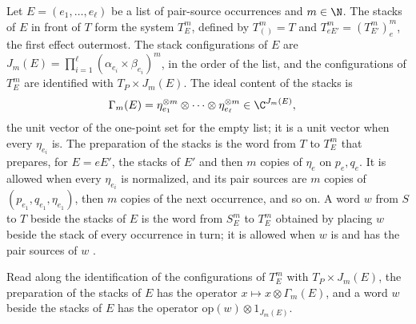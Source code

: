 \begin{definition}
    \label{def:party_effect_stack}
    \leanok
    Let $E=(e_1,\dots,e_\ell)$ be a list of pair-source occurrences and $m\in\N$. The
    stacks of $E$ in front of $T$ form the system $T^m_E$, defined by $T^m_{()}=T$ and
    $T^m_{eE'}=(T^m_{E'})^m_e$, the first effect outermost. The stack
    configurations of $E$ are
    $J_m(E)=\prod_{i=1}^\ell(\alpha_{e_i}\times\beta_{e_i})^m$, in the order of the
    list, and the configurations of $T^m_E$ are identified with $T_P\times J_m(E)$.
    The ideal content of the stacks is
    \begin{align}
        \Gamma_m(E)
         & =\eta_{e_1}^{\otimes m}\otimes\cdots\otimes\eta_{e_\ell}^{\otimes m}
        \in\C^{J_m(E)},
        \label{eq:party_stack_content}
    \end{align}
    the unit vector of the one-point set for the empty list; it is a unit vector
    when every $\eta_{e_i}$ is. The preparation of the stacks is the word from $T$ to
    $T^m_E$ that prepares, for $E=eE'$, the stacks of $E'$ and then $m$ copies of
    $\eta_e$ on $p_e,q_e$. It is allowed when every $\eta_{e_i}$ is normalized, and
    its pair sources are $m$ copies of $(p_{e_1},q_{e_1},\eta_{e_1})$, then $m$
    copies of the next occurrence, and so on. A word $w$ from $S$ to $T$ beside the
    stacks of $E$ is the word from $S^m_E$ to $T^m_E$ obtained by placing $w$ beside
    the stack of every occurrence in turn; it is allowed when $w$ is and has the pair
    sources of $w$ \cite[Lemma~5.1]{OpenAI2026PolynomialPEPS}.
\end{definition}

\begin{theorem}
    \label{thm:party_op_effect_stack}
    \leanok
    Read along the identification of the configurations of $T^m_E$ with
    $T_P\times J_m(E)$, the preparation of the stacks of $E$ has the operator
    $x\mapsto x\otimes\Gamma_m(E)$, and a word $w$ beside the stacks of $E$ has the
    operator $\mathrm{op}(w)\otimes1_{J_m(E)}$.
\end{theorem}

